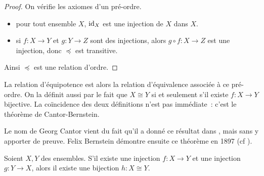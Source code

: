 \begin{proof}
  On vérifie les axiomes d'un pré-ordre.
  \begin{itemize}
  \item pour tout ensemble $X$, $\operatorname{id}_X$ est une injection de $X$ dans $X$.
  \item si $f : X \to Y$ et $g : Y \to Z$ sont des injections, alors
    $g\circ f : X \to Z$ est une injection, donc $\preceq$ est transitive.
  \end{itemize}
  Ainsi $\preceq$ est une relation d'ordre.
\end{proof}

La relation d'équipotence est alors la relation d'équivalence associée à ce
pré-ordre. On la définit aussi par le fait que $X\cong Y$ si et seulement s'il
existe $f : X \to Y$ bijective. La coïncidence des deux définitions n'est pas
immédiate~: c'est le théorème de Cantor-Bernstein.

Le nom de Georg Cantor vient du fait qu'il a donné ce résultat dans 
\cite{Cantor1887}, mais sans y apporter de preuve. Felix Bernstein démontre
ensuite ce théorème en 1897 (cf \cite{deiser2004einführung}).

\begin{theorem}
  Soient $X,Y$ des ensembles. S'il existe une injection $f : X \to Y$ et une
  injection $g : Y \to X$, alors il existe une bijection $h : X \cong Y$.
\end{theorem}

